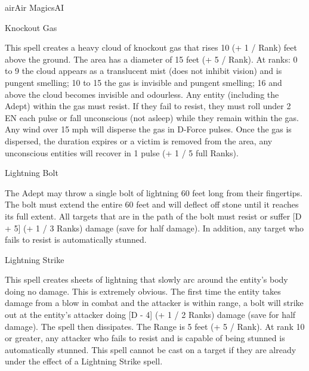 \begin{college}[2.1]{air}{Air Magics}{AI}
\begin{spell}[S-9]{Knockout Gas}
\begin{effects}
This spell creates a heavy cloud of knockout gas that rises 10 (+ 1 /
Rank) feet above the ground. The area has a diameter of 15 feet
(+ 5 / Rank). At ranks: 0 to 9 the cloud appears as a translucent mist
(\ie does not inhibit vision) and is pungent smelling; 10 to 15 the
gas is invisible and pungent smelling; 16 and above the cloud becomes
invisible and odourless. Any entity (including the Adept) within the
gas must resist. If they fail to resist, they must roll under 2 \x EN
each pulse or fall unconscious (not asleep) while they remain within
the gas. Any wind over 15 mph will disperse the gas in D-Force
pulses. Once the gas is dispersed, the duration expires or a victim
is removed from the area, any unconscious entities will recover in 1
pulse (+ 1 / 5 full Ranks).
\end{effects}
\end{spell}

\begin{spell}[S-10]{Lightning Bolt}

\begin{effects}
The Adept may throw a single bolt of lightning 60 feet long from their
fingertips. The bolt must extend the entire 60 feet and will deflect
off stone until it reaches its full extent.  All targets that are in
the path of the bolt must resist or suffer [D + 5] (+ 1 / 3 Ranks)
damage (save for half damage). In addition, any target who fails to
resist is automatically stunned.
\end{effects}
\end{spell}

\begin{spell}[S-11]{Lightning Strike}

\begin{effects}
This spell creates sheets of lightning that slowly arc around the
entity's body doing no damage. This is extremely obvious. The first
time the entity takes damage from a blow in combat and the attacker is
within range, a bolt will strike out at the entity's attacker doing [D
- 4] (+ 1 / 2 Ranks) damage (save for half damage).  The spell then
dissipates. The Range is 5 feet (+ 5 / Rank). At rank 10 or greater,
any attacker who fails to resist and is capable of being stunned is
automatically stunned. This spell cannot be cast on a target if they
are already under the effect of a Lightning Strike spell.
\end{effects}
\end{spell}


\end{college}
